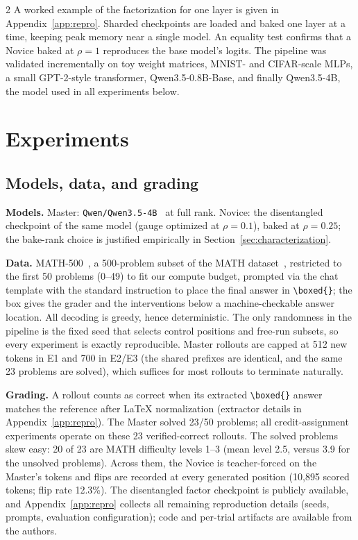 \documentclass[9pt]{article}
\begin{document}
\begin{multicols}{2}
A worked example of the factorization for one layer is given in
Appendix~\ref{app:repro}. Sharded checkpoints are loaded and baked one layer at a time,
keeping peak memory near a single model. An equality test confirms that a Novice baked at
$\rho{=}1$ reproduces the base model's logits.
The pipeline was validated incrementally on toy weight matrices, MNIST- and
CIFAR-scale MLPs, a small GPT-2-style transformer, Qwen3.5-0.8B-Base, and
finally Qwen3.5-4B, the model used in all experiments below.

\section{Experiments}

\subsection{Models, data, and grading}

\textbf{Models.} Master: \texttt{Qwen/Qwen3.5-4B}~\citep{qwen35blog} at full
rank. Novice: the
disentangled checkpoint of the same model (gauge optimized at $\rho{=}0.1$),
baked at $\rho{=}0.25$; the bake-rank choice is justified empirically in
Section~\ref{sec:characterization}.

\textbf{Data.} MATH-500~\citep{lightman2023letsverify}, a 500-problem subset
of the MATH
dataset~\citep{hendrycks2021measuringmathematicalproblemsolving}, restricted to the
first 50 problems (0--49) to fit our compute budget,
prompted via the chat template with the standard instruction to place the
final answer in \texttt{\textbackslash boxed\{\}}; the box gives the grader
and the interventions below a machine-checkable answer location. All decoding
is greedy, hence deterministic. The only randomness in the pipeline is the
fixed seed that selects control positions and free-run subsets, so every
experiment is exactly reproducible. Master rollouts are capped at 512
new tokens in E1 and 700 in E2/E3 (the shared prefixes are identical, and
the same 23 problems are solved), which suffices for most rollouts to
terminate naturally.

\textbf{Grading.} A rollout counts as correct when its extracted
\texttt{\textbackslash boxed\{\}} answer matches the reference after LaTeX
normalization (extractor details in Appendix~\ref{app:repro}). The Master
solved 23/50 problems; all
credit-assignment experiments operate on these 23 verified-correct rollouts.
The solved problems skew easy: 20 of 23 are MATH difficulty levels 1--3
(mean level 2.5, versus 3.9 for the unsolved problems).
Across them, the Novice is teacher-forced on the Master's tokens and flips are
recorded at every generated position (10{,}895 scored tokens; flip rate
12.3\%). The disentangled factor checkpoint is publicly available, and
Appendix~\ref{app:repro} collects all remaining reproduction details (seeds,
prompts, evaluation configuration); code and per-trial artifacts are
available from the authors.


\end{multicols}
\end{document}
